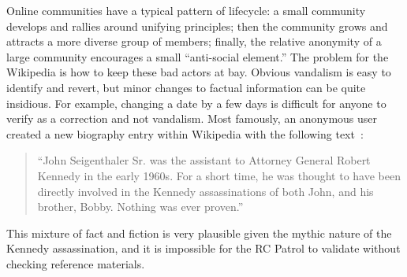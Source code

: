 Online communities have a typical pattern of lifecycle:
a small community develops and rallies around unifying principles;
then the community grows and attracts a more diverse group of members;
finally, the relative anonymity of a large community encourages
a small ``anti-social element.''
The problem for the Wikipedia is how to keep these bad actors at bay.
Obvious vandalism is easy to identify and revert,
but minor changes to factual information can be quite insidious.
For example, changing a date by a few days is difficult for anyone
to verify as a correction and not vandalism.
Most famously, an anonymous user created a new biography entry
within Wikipedia with the following
text~\cite{Seigenthaler05,NewYorkTimes05a,NewYorkTimes05b}:
\begin{quote}
``John Seigenthaler Sr. was the assistant to
Attorney General Robert Kennedy in the early 1960s.
For a short time, he was thought to have been directly involved
in the Kennedy assassinations of both John, and his brother, Bobby.
Nothing was ever proven.''
\end{quote}
This mixture of fact and fiction is very plausible given the
mythic nature of the Kennedy assassination, and it is impossible
for the RC Patrol to validate without checking reference materials.



